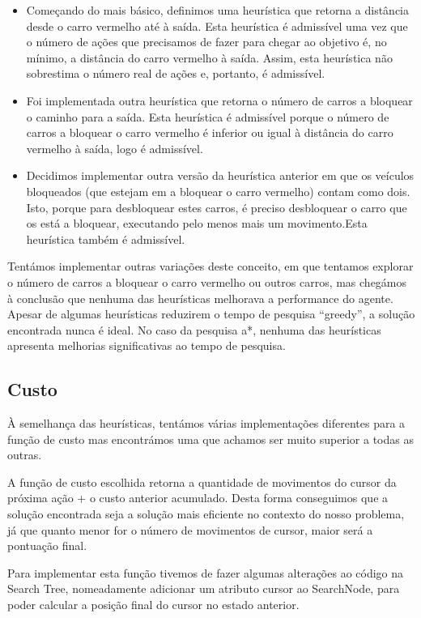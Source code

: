 \documentclass[12pt]{report}
\begin{document}
\begin{itemize}
\item \par Começando do mais básico, definimos uma heurística que retorna a distância desde o carro vermelho até à saída. Esta heurística é admissível uma vez que o número de ações que precisamos de fazer para chegar ao objetivo é, no mínimo, a distância do carro vermelho à saída. Assim, esta heurística não sobrestima o número real de ações e, portanto, é admissível. 

\item \par Foi implementada outra heurística que retorna o número de carros a bloquear o caminho para a saída. Esta heurística é admissível porque o número de carros a bloquear o carro vermelho é inferior ou igual à distância do carro vermelho à saída, logo é admissível.

\item \par Decidimos implementar outra versão da heurística anterior em que os veículos bloqueados (que estejam em a bloquear o carro vermelho) contam como dois. Isto, porque para desbloquear estes carros, é preciso desbloquear o carro que os está a bloquear, executando pelo menos mais um movimento.Esta heurística  também é admissível.

\end{itemize}

Tentámos implementar outras variações deste conceito, em que tentamos explorar o número de carros a bloquear o carro vermelho ou outros carros, mas chegámos à conclusão que nenhuma das heurísticas melhorava a performance do agente. Apesar de algumas heurísticas reduzirem o tempo de pesquisa “greedy”, a solução encontrada nunca é ideal. No caso da pesquisa a*, nenhuma das heurísticas apresenta melhorias significativas ao tempo de pesquisa.

\subsection{Custo}

\par À semelhança das heurísticas, tentámos várias implementações diferentes para a função de custo mas encontrámos uma que achamos ser muito superior a todas as outras.
\par A função de custo escolhida retorna a quantidade de movimentos do cursor da próxima ação + o custo anterior acumulado. Desta forma conseguimos que a solução encontrada seja a solução mais eficiente no contexto do nosso problema, já que quanto menor for o número de movimentos de cursor, maior será a pontuação final.
\par Para implementar esta função tivemos de fazer algumas alterações ao código na Search Tree, nomeadamente adicionar um atributo cursor ao SearchNode, para poder calcular a posição final do cursor no estado anterior.
\end{document}
